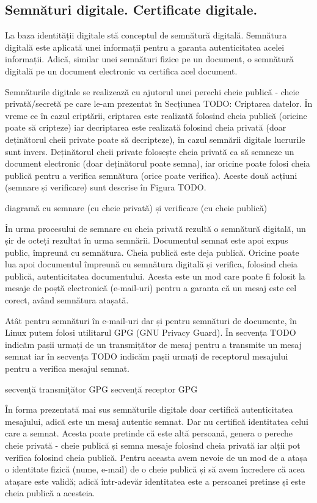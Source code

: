 \subsection{Semnături digitale. Certificate digitale.}
\label{sec:sec:sign}

La baza identității digitale stă conceptul de semnătură digitală. Semnătura digitală este aplicată unei informații pentru a garanta autenticitatea acelei informații. Adică, similar unei semnături fizice pe un document, o semnătură digitală pe un document electronic va certifica acel document.

Semnăturile digitale se realizează cu ajutorul unei perechi cheie publică - cheie privată/secretă pe care le-am prezentat în Secțiunea TODO: Criptarea datelor. În vreme ce în cazul criptării, criptarea este realizată folosind cheia publică (oricine poate să cripteze) iar decriptarea este realizată folosind cheia privată (doar deținătorul cheii private poate să decripteze), în cazul semnării digitale lucrurile sunt invers. Deținătorul cheii private folosește cheia privată ca să semneze un document electronic (doar deținătorul poate semna), iar oricine poate folosi cheia publică pentru a verifica semnătura (orice poate verifica). Aceste două acțiuni (semnare și verificare) sunt descrise în Figura TODO.

diagramă cu semnare (cu cheie privată) și verificare (cu cheie publică)

În urma procesului de semnare cu cheia privată rezultă o semnătură digitală, un șir de octeți rezultat în urma semnării. Documentul semnat este apoi expus public, împreună cu semnătura. Cheia publică este deja publică. Oricine poate lua apoi documentul împreună cu semnătura digitală și verifica, folosind cheia publică, autenticitatea documentului. Acesta este un mod care poate fi folosit la mesaje de poștă electronică (e-mail-uri) pentru a garanta că un mesaj este cel corect, având semnătura atașată.

Atât pentru semnături în e-mail-uri dar și pentru semnături de documente, în Linux putem folosi utilitarul GPG (GNU Privacy Guard). În secvența TODO indicăm pașii urmați de un transmițător de mesaj pentru a transmite un mesaj semnat iar în secvența TODO indicăm pașii urmați de receptorul mesajului pentru a verifica mesajul semnat.

secvență transmițător GPG
secvență receptor GPG

În forma prezentată mai sus semnăturile digitale doar certifică autenticitatea mesajului, adică este un mesaj autentic semnat. Dar nu certifică identitatea celui care a semnat. Acesta poate pretinde că este altă persoană, genera o pereche cheie privată - cheie publică și semna mesaje folosind cheia privată iar alții pot verifica folosind cheia publică. Pentru aceasta avem nevoie de un mod de a atașa o identitate fizică (nume, e-mail) de o cheie publică și să avem încredere că acea atașare este validă; adică într-adevăr identitatea este a persoanei pretinse și este cheia publică a acesteia.

